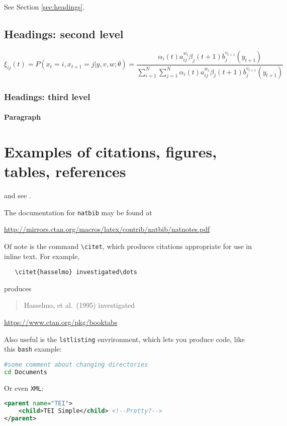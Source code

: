 \begin{review}
\lipsum[4] See Section \ref{sec:headings}.

\subsection{Headings: second level}
\lipsum[5]
\begin{equation}
\xi _{ij}(t)=P(x_{t}=i,x_{t+1}=j|y,v,w;\theta)= {\frac {\alpha _{i}(t)a^{w_t}_{ij}\beta _{j}(t+1)b^{v_{t+1}}_{j}(y_{t+1})}{\sum _{i=1}^{N} \sum _{j=1}^{N} \alpha _{i}(t)a^{w_t}_{ij}\beta _{j}(t+1)b^{v_{t+1}}_{j}(y_{t+1})}}
\end{equation}

\subsubsection{Headings: third level}
\lipsum[6]

\paragraph{Paragraph}
\lipsum[7]

\section*{Examples of citations, figures, tables, references}
\label{sec:others}
\lipsum[8] \citep{wiki:xxx} and see \cite{wiki:xxx}.

The documentation for \verb+natbib+ may be found at
\begin{center}
  \url{http://mirrors.ctan.org/macros/latex/contrib/natbib/natnotes.pdf}
\end{center}
Of note is the command \verb+\citet+, which produces citations
appropriate for use in inline text.  For example,
\begin{verbatim}
   \citet{hasselmo} investigated\dots
\end{verbatim}
produces
\begin{quote}
  Hasselmo, et al.\ (1995) investigated
\end{quote}

\begin{center}
  \url{https://www.ctan.org/pkg/booktabs}
\end{center}
Also useful is the \verb+lstlisting+ envrironment, which lets you produce code, like this \verb+bash+ example:
\begin{lstlisting}[language=bash]
#some comment about changing directories
cd Documents
\end{lstlisting}
Or even \verb+XML+:
\begin{lstlisting}[language=XML]
<parent name="TEI">
    <child>TEI Simple</child> <!--Pretty?-->
</parent>



\end{lstlisting}
\end{review}
